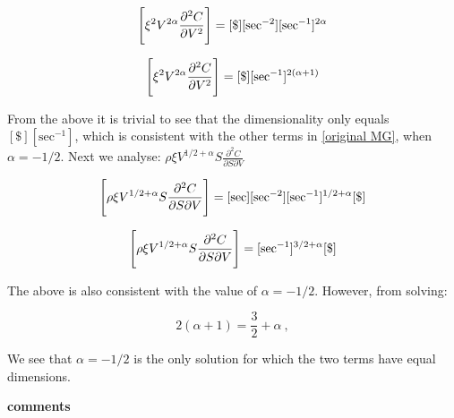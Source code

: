 \documentclass[english,12pt]{article}
\begin{document}
\begin{equation}
\Bigg{[} \xi^2 V^{2 \alpha}  \frac{\partial^2 C}{\partial V^2} \Bigg{]} = [\$] [\text{sec}^{-2}][\text{sec}^{-1}]^{2\alpha}
\end{equation}

\begin{equation}
\Bigg{[} \xi^2 V^{2 \alpha}  \frac{\partial^2 C}{\partial V^2} \Bigg{]} = [\$] [\text{sec}^{-1}]^{2(\alpha + 1)}
\end{equation}

From the above it is trivial to see that the dimensionality only equals $[\$][\text{sec}^{-1}]$, which is consistent with the other terms in \ref{original MG}, when $\alpha = -1/2$. Next we analyse: $\rho \xi V^{1/2+\alpha} S \frac{\partial^2 C}{\partial S \partial V}$

\begin{equation}
\Bigg{[} \rho \xi V^{1/2+\alpha} S \frac{\partial^2 C}{\partial S \partial V} \Bigg{]} = [\text{sec}][\text{sec}^{-2}][\text{sec}^{-1}]^{1/2+\alpha}[\$]
\end{equation}

\begin{equation}
\Bigg{[} \rho \xi V^{1/2+\alpha} S \frac{\partial^2 C}{\partial S \partial V} \Bigg{]} = [\text{sec}^{-1}]^{3/2+\alpha}[\$]
\end{equation}


The above is also consistent with the value of $\alpha = -1/2$. However, from solving: 

\begin{equation}
2(\alpha + 1) = \frac{3}{2} + \alpha~,
\end{equation}

We see that $\alpha = -1/2$ is the only solution for which the two terms have equal dimensions.




{\bf comments}
\end{document}
